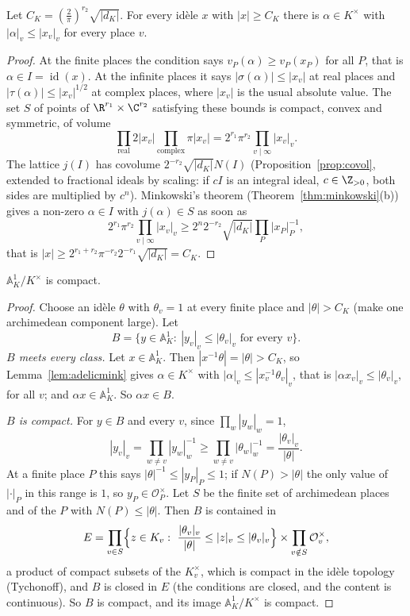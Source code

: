\begin{lemma}\label{lem:adelicmink}
Let $C_K=(\frac2\pi)^{r_2}\sqrt{|d_K|}$. For every id\`ele $x$ with $|x|\ge C_K$ there is $\alpha\in K^\times$ with $|\alpha|_v\le|x_v|_v$ for every place $v$.
\end{lemma}
\begin{proof}
At the finite places the condition says $v_P(\alpha)\ge v_P(x_P)$ for all $P$, that is $\alpha\in I=\operatorname{id}(x)$. At the infinite places it says
$|\sigma(\alpha)|\le|x_v|$ at real places and $|\tau(\alpha)|\le|x_v|^{1/2}$ at complex places, where $|x_v|$ is the usual absolute value. The set $S$ of
points of $\R^{r_1}\times\C^{r_2}$ satisfying these bounds is compact, convex and symmetric, of volume
\[
\prod_{\text{real}}2|x_v|\prod_{\text{complex}}\pi|x_v|=2^{r_1}\pi^{r_2}\prod_{v\mid\infty}|x_v|_v.
\]
The lattice $j(I)$ has covolume $2^{-r_2}\sqrt{|d_K|}N(I)$ (Proposition~\ref{prop:covol}, extended to fractional ideals by scaling: if $cI$ is an
integral ideal, $c\in\Z_{>0}$, both sides are multiplied by $c^n$). Minkowski's theorem (Theorem~\ref{thm:minkowski}(b)) gives a non-zero $\alpha\in I$
with $j(\alpha)\in S$ as soon as
\[
2^{r_1}\pi^{r_2}\prod_{v\mid\infty}|x_v|_v\ge2^n2^{-r_2}\sqrt{|d_K|}\prod_P|x_P|_P^{-1},
\]
that is $|x|\ge2^{r_1+r_2}\pi^{-r_2}2^{-r_1}\sqrt{|d_K|}=C_K$.
\end{proof}

\begin{theorem}[Fujisaki]\label{thm:fujisaki}
$\mathbb{A}_K^1/K^\times$ is compact.
\end{theorem}
\begin{proof}
Choose an id\`ele $\theta$ with $\theta_v=1$ at every finite place and $|\theta|>C_K$ (make one archimedean component large). Let
\[
B=\bigl\{y\in\mathbb{A}_K^1:\ |y_v|_v\le|\theta_v|_v\text{ for every }v\bigr\}.
\]
\emph{$B$ meets every class.} Let $x\in\mathbb{A}_K^1$. Then $|x^{-1}\theta|=|\theta|>C_K$, so Lemma~\ref{lem:adelicmink} gives $\alpha\in K^\times$ with
$|\alpha|_v\le|x_v^{-1}\theta_v|_v$, that is $|\alpha x_v|_v\le|\theta_v|_v$, for all $v$; and $\alpha x\in\mathbb{A}_K^1$. So $\alpha x\in B$.

\emph{$B$ is compact.} For $y\in B$ and every $v$, since $\prod_w|y_w|_w=1$,
\[
|y_v|_v=\prod_{w\ne v}|y_w|_w^{-1}\ge\prod_{w\ne v}|\theta_w|_w^{-1}=\frac{|\theta_v|_v}{|\theta|}.
\]
At a finite place $P$ this says $|\theta|^{-1}\le|y_P|_P\le1$; if $N(P)>|\theta|$ the only value of $|\cdot|_P$ in this range is $1$, so $y_P\in\mathcal O_P^\times$. Let
$S$ be the finite set of archimedean places and of the $P$ with $N(P)\le|\theta|$. Then $B$ is contained in
\[
E=\prod_{v\in S}\Bigl\{z\in K_v:\ \frac{|\theta_v|_v}{|\theta|}\le|z|_v\le|\theta_v|_v\Bigr\}\times\prod_{v\notin S}\mathcal O_v^\times ,
\]
a product of compact subsets of the $K_v^\times$, which is compact in the id\`ele topology (Tychonoff), and $B$ is closed in $E$ (the conditions are
closed, and the content is continuous). So $B$ is compact, and its image $\mathbb{A}_K^1/K^\times$ is compact.
\end{proof}

